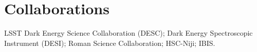 \section{Collaborations}
LSST Dark Energy Science Collaboration (DESC);
Dark Energy Spectroscopic Instrument (DESI);
Roman Science Collaboration;
HSC-Niji;
IBIS.
